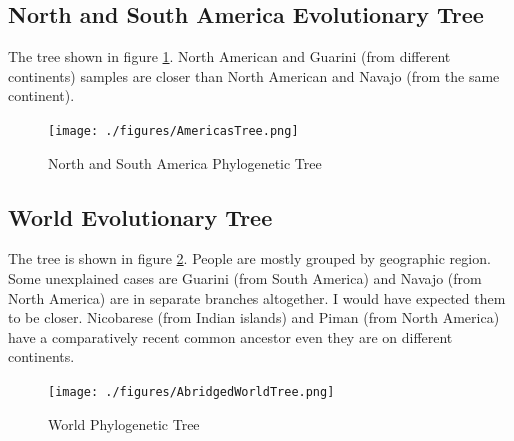 \documentclass[conference]{IEEEtran}
\begin{document}
\FloatBarrier
\subsection{North and South America Evolutionary Tree}

The tree shown in figure \ref{AmericasTree}. North American and Guarini (from different continents) samples are closer than North American and Navajo (from the same continent).

\begin{figure}[!t]
\centering
\texttt{[image: ./figures/AmericasTree.png]}
\caption{North and South America Phylogenetic Tree}
\label{AmericasTree}
\end{figure}

\FloatBarrier
\subsection{World Evolutionary Tree}

The tree is shown in figure \ref{AbridgedWorldTree}. People are mostly grouped by geographic region. Some unexplained cases are Guarini (from South America) and Navajo (from North America) are in separate branches altogether. I would have expected them to be closer. Nicobarese (from Indian islands) and Piman (from North America) have a comparatively recent common ancestor even they are on different continents.

\begin{figure}[!t]
\centering
\texttt{[image: ./figures/AbridgedWorldTree.png]}
\caption{World Phylogenetic Tree}
\label{AbridgedWorldTree}
\end{figure}
\end{document}
